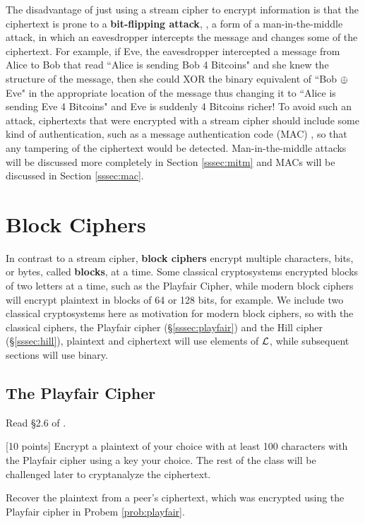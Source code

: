 The disadvantage of just using a stream cipher to encrypt information is that the ciphertext is prone to a {\bf bit-flipping attack}, , a form of a man-in-the-middle attack,  in which an eavesdropper intercepts the message and changes some of the ciphertext. For example, if Eve, the eavesdropper intercepted a message from Alice to Bob that read ``Alice is sending Bob 4 Bitcoins" and she knew the structure of the message, then she could XOR the binary equivalent of ``Bob $\oplus$ Eve" in the appropriate location of the message thus changing it to ``Alice is sending Eve 4 Bitcoins" and Eve is suddenly 4 Bitcoins richer! To avoid such an attack, ciphertexts that were encrypted with a stream cipher should include some kind of authentication, such as a message authentication code (MAC) , so that any tampering of the ciphertext would be detected. Man-in-the-middle attacks will be discussed more completely in Section \ref{sssec:mitm} and MACs will be discussed in Section \ref{sssec:mac}.

	\section{Block Ciphers}

In contrast to a stream cipher, {\bf block ciphers}  encrypt multiple characters, bits, or bytes, called {\bf blocks},  at a time. Some classical cryptosystems encrypted blocks of two letters at a time, such as the Playfair Cipher, while modern block ciphers will encrypt plaintext in blocks of 64 or 128 bits, for example. We include two classical cryptosystems here as motivation for modern block ciphers, so with the classical ciphers, the Playfair cipher (\S \ref{sssec:playfair}) and the Hill cipher (\S \ref{sssec:hill}), plaintext and ciphertext will use elements of $\mathcal{L}$, while subsequent sections will use binary.

		\subsection{The Playfair Cipher} 
		\label{sssec:playfair}
		Read \S 2.6 of \cite{tw}.

\begin{problem}
\label{prob:playfair}  [10 points]
Encrypt a plaintext of your choice with at least 100 characters with the Playfair cipher using a key your choice. The rest of the class will be challenged later to cryptanalyze the ciphertext.
\end{problem}
\begin{problem}  [15 points]
Recover the plaintext from a peer's ciphertext, which was encrypted using the Playfair cipher in Probem \ref{prob:playfair}.
\end{problem}

